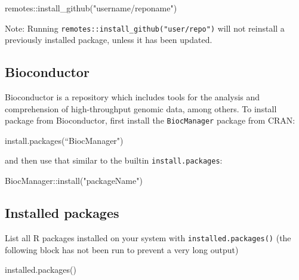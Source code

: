 \documentclass[
]{book}
\newenvironment{Shaded}{\begin{snugshade}}{\end{snugshade}}
\newcommand{\FunctionTok}[1]{\textcolor[rgb]{0.00,0.00,0.00}{#1}}
\newcommand{\NormalTok}[1]{#1}
\newcommand{\SpecialCharTok}[1]{\textcolor[rgb]{0.00,0.00,0.00}{#1}}
\newcommand{\StringTok}[1]{\textcolor[rgb]{0.31,0.60,0.02}{#1}}
\begin{document}
\begin{Shaded}
\begin{Highlighting}[]
\NormalTok{remotes}\SpecialCharTok{::}\FunctionTok{install\_github}\NormalTok{(}\StringTok{"username/reponame"}\NormalTok{)}
\end{Highlighting}
\end{Shaded}

Note: Running \texttt{remotes::install\_github("user/repo")} will not reinstall a previously installed package, unless it has been updated.

\hypertarget{bioconductor}{%
\subsection{Bioconductor}\label{bioconductor}}

Bioconductor is a repository which includes tools for the analysis and comprehension of high-throughput genomic data, among others. To install package from Bioconductor, first install the \texttt{BiocManager} package from CRAN:

\begin{Shaded}
\begin{Highlighting}[]
\FunctionTok{install.packages}\NormalTok{(“BiocManager}\StringTok{")}
\end{Highlighting}
\end{Shaded}

and then use that similar to the builtin \texttt{install.packages}:

\begin{Shaded}
\begin{Highlighting}[]
\NormalTok{BiocManager}\SpecialCharTok{::}\FunctionTok{install}\NormalTok{(}\StringTok{"packageName"}\NormalTok{)}
\end{Highlighting}
\end{Shaded}

\hypertarget{installed-packages}{%
\subsection{Installed packages}\label{installed-packages}}

List all R packages installed on your system with \texttt{installed.packages()} (the following block has not been run to prevent a very long output)

\begin{Shaded}
\begin{Highlighting}[]
\FunctionTok{installed.packages}\NormalTok{()}
\end{Highlighting}
\end{Shaded}
\end{document}
